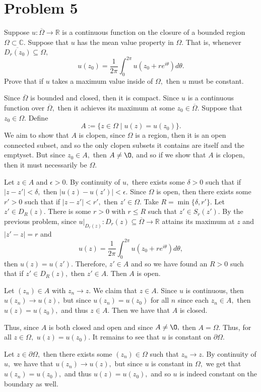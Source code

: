 \documentclass[11pt]{article}
\newcommand{\bbC}{\mathbb{C}}
\newcommand{\bbR}{\mathbb{R}}
\renewcommand{\emptyset}{\O}
\begin{document}
\section*{Problem 5}
\begin{problem}
    Suppose $u: \overline{\Omega} \to \bbR$ is a continuous function on the closure of a bounded region $\Omega \subset \bbC.$ Suppose that $u$ has the mean value property in $\Omega.$ That is, whenever $\overline{D_r(z_0)}\subseteq \Omega,$
    \[u(z_0) = \frac{1}{2\pi}\int_0^{2\pi} u(z_0 + re^{i\theta})d\theta.\] Prove that if $u$ takes a maximum value inside of $\Omega,$ then $u$ must be constant.
\end{problem}
\begin{solution}
Since $\overline{\Omega}$ is bounded and closed, then it is compact. Since $u$ is a continuous function over $\overline{\Omega},$ then it achieves its maximum at some $z_0 \in \overline{\Omega}.$ Suppose that $z_0 \in \Omega.$ Define 
    \[A:= \{z \in \Omega \mid u(z) = u(z_0)\}.\] We aim to show that $A$ is clopen,
    since $\Omega$ is a region, then it is an open connected subset, and so the only clopen subsets it contains are itself and the emptyset. But since $z_0 \in A,$ then $A \neq \emptyset,$ and so if we show that $A$ is clopen, then it must necessarily be $\Omega.$

    Let $z \in A$ and $\epsilon>0.$ By continuity of $u,$ there exists some $\delta>0$ such that if $|z - z'| < \delta,$ then $|u(z) - u(z')| < \epsilon.$ Since $\Omega$ is open, then there exists some $r'>0$ such that if $|z - z'| < r',$ then $z' \in \Omega.$ Take $R = \min\{\delta, r'\}.$ Let $z' \in D_R(z).$ There is some $r>0$ with $r \leq R$ such that $z' \in S_r(z').$ By the previous problem, since $u|_{D_r(z)}: D_r(z)\subseteq \overline{\Omega} \to \bbR$ attains its maximum at $z$ and $|z' - z| = r$ and 
    \[u(z) = \frac{1}{2\pi}\int_0^{2\pi}u(z_0  + re^{i\theta})d\theta,\] then $u(z) = u(z').$ Therefore, $z' \in A$ and so we have found an $R>0$ such that if $z' \in D_R(z),$ then $z' \in A.$ Then $A$ is open.

    Let $(z_n) \in A$ with $z_n \to z.$ We claim that $z\in A.$ Since $u$ is continuous, then $u(z_n) \to u(z),$ but since $u(z_n) = u(z_0)$ for all $n$ since each $z_n \in A,$ then $u(z) = u(z_0),$ and thus $z \in A.$ Then we have that $A$ is closed.

    Thus, since $A$ is both closed and open and since $A\neq \emptyset,$ then $A  = \Omega.$ Thus, for all $z\in \Omega,$ $u(z)= u(z_0).$ It remains to see that $u$ is constant on $\partial \Omega.$ 

    Let $z \in \partial \Omega,$ then there exists some $(z_n) \in \Omega$ such that $z_n \to z.$ By continuity of $u,$ we have that $u(z_n) \to u(z),$ but since $u$ is constant in $\Omega,$ we get that $u(z_n) = u(z_0),$ and thus $u(z) = u(z_0),$ and so $u$ is indeed constant on the boundary as well.
\end{solution}
\end{document}

